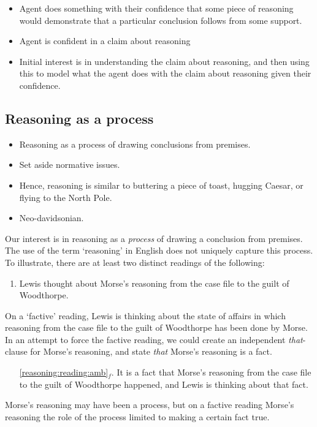 \documentclass[10pt]{article}
\begin{document}
\begin{itemize}
\item Agent does something with their confidence that some piece of reasoning would demonstrate that a particular conclusion follows from some support.
\item Agent is confident in a claim about reasoning
\item Initial interest is in understanding the claim about reasoning, and then using this to model what the agent does with the claim about reasoning given their confidence.
\end{itemize}

\subsection{Reasoning as a process}
\label{sec:reasoning-as-process}

\begin{itemize}
\item Reasoning as a process of drawing conclusions from premises.
\item Set aside normative issues.
\item Hence, reasoning is similar to buttering a piece of toast, hugging Caesar, or flying to the North Pole.
\item Neo-davidsonian.
\end{itemize}

Our interest is in reasoning as a \emph{process} of drawing a conclusion from premises.
The use of the term `reasoning' in English does not uniquely capture this process.
To illustrate, there are at least two distinct readings of the following:
\begin{enumerate}
\item\label{reasoning:reading:amb} Lewis thought about Morse's reasoning from the case file to the guilt of Woodthorpe.
\end{enumerate}

On a `factive' reading, Lewis is thinking about the state of affairs in which reasoning from the case file to the guilt of Woodthorpe has been done by Morse.
In an attempt to force the factive reading, we could create an independent \emph{that}-clause for Morse's reasoning, and state \emph{that} Morse's reasoning is a fact.
\begin{enumerate}
\item[\ref{reasoning:reading:amb}\(_{f}\).] It is a fact that Morse's reasoning from the case file to the guilt of Woodthorpe happened, and Lewis is thinking about that fact.
\end{enumerate}
Morse's reasoning may have been a process, but on a factive reading Morse's reasoning the role of the process limited to making a certain fact true.
\end{document}
